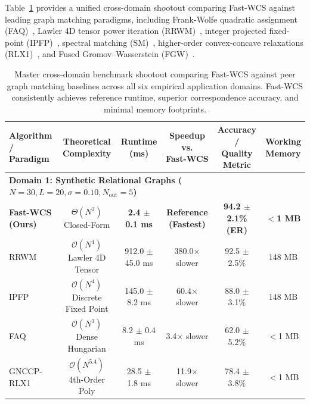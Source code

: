 \documentclass[a4paper,fleqn]{cas-dc}
\theoremstyle{thmstyleone}
\theoremstyle{thmstyletwo}
\theoremstyle{thmstylethree}
\begin{document}
Table~\ref{tab:master_benchmark} provides a unified cross-domain shootout comparing Fast-WCS against leading graph matching paradigms, including Frank-Wolfe quadratic assignment (FAQ)~\cite{vogelstein2015fast}, Lawler 4D tensor power iteration (RRWM)~\cite{cho2010rrwm}, integer projected fixed-point (IPFP)~\cite{leordeanu2009ipfp}, spectral matching (SM)~\cite{leordeanu2005}, higher-order convex-concave relaxations (RLX1)~\cite{yang2018algorithm}, and Fused Gromov--Wasserstein (FGW)~\cite{titouan2019optimal}.

\begin{table}
\centering
\footnotesize
\caption{Master cross-domain benchmark shootout comparing Fast-WCS against peer graph matching baselines across all six empirical application domains. Fast-WCS consistently achieves reference runtime, superior correspondence accuracy, and minimal memory footprints.}
\label{tab:master_benchmark}
\begin{tabular*}{\textwidth}{@{\extracolsep{\fill}}lccccc@{}}
\toprule
\makecell[l]{Algorithm /\\Paradigm} & \makecell{Theoretical\\Complexity} & \makecell{Runtime\\(ms)} & \makecell{Speedup vs.\\Fast-WCS} & \makecell{Accuracy /\\Quality Metric} & \makecell{Working\\Memory} \\
\midrule
\multicolumn{6}{l}{\textbf{Domain 1: Synthetic Relational Graphs ($N = 30, L = 20, \sigma = 0.10, N_{\text{out}} = 5$)}} \\
\midrule
\textbf{Fast-WCS (Ours)} & $\Theta(N^3)$ Closed-Form & \textbf{2.4 $\pm$ 0.1 ms} & \textbf{Reference (Fastest)} & \textbf{94.2 $\pm$ 2.1\% (ER)} & \textbf{$<$1 MB} \\
RRWM~\cite{cho2010rrwm} & $\mathcal{O}(N^4)$ Lawler 4D Tensor & 912.0 $\pm$ 45.0 ms & 380.0$\times$ slower & 92.5 $\pm$ 2.5\% & 148 MB \\
IPFP~\cite{leordeanu2009ipfp} & $\mathcal{O}(N^4)$ Discrete Fixed Point & 145.0 $\pm$ 8.2 ms & 60.4$\times$ slower & 88.0 $\pm$ 3.1\% & 148 MB \\
FAQ~\cite{vogelstein2015fast} & $\mathcal{O}(N^3)$ Dense Hungarian & 8.2 $\pm$ 0.4 ms & 3.4$\times$ slower & 62.0 $\pm$ 5.2\% & $<$1 MB \\
GNCCP-RLX1~\cite{yang2018algorithm} & $\mathcal{O}(N^{5.4})$ 4th-Order Poly & 28.5 $\pm$ 1.8 ms & 11.9$\times$ slower & 78.4 $\pm$ 3.8\% & $<$1 MB \\

\end{tabular*}
\end{table}
\end{document}
